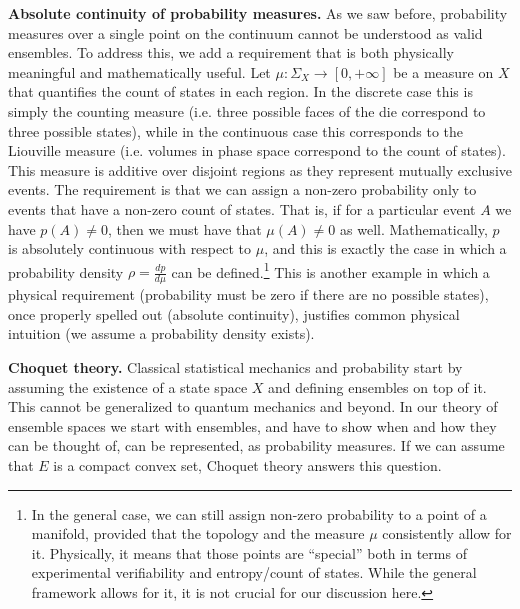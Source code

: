 \documentclass[10pt,twocolumn, nofootinbib]{revtex4-2}
\begin{document}
\textbf{Absolute continuity of probability measures.} As we saw before, probability measures over a single point on the continuum cannot be understood as valid ensembles. To address this, we add a requirement that is both physically meaningful and mathematically useful. Let $\mu : \Sigma_X \to [0, + \infty]$ be a measure on $X$ that quantifies the count of states in each region. In the discrete case this is simply the counting measure (i.e. three possible faces of the die correspond to three possible states), while in the continuous case this corresponds to the Liouville measure (i.e. volumes in phase space correspond to the count of states). This measure is additive over disjoint regions as they represent mutually exclusive events. The requirement is that we can assign a non-zero probability only to events that have a non-zero count of states. That is, if for a particular event $A$ we have $p(A) \neq 0$, then we must have that $\mu(A) \neq 0$ as well. Mathematically, $p$ is absolutely continuous with respect to $\mu$, and this is exactly the case in which a probability density $\rho = \frac{dp}{d\mu}$ can be defined.\footnote{In the general case, we can still assign non-zero probability to a point of a manifold, provided that the topology and the measure $\mu$ consistently allow for it. Physically, it means that those points are ``special'' both in terms of experimental verifiability and entropy/count of states. While the general framework allows for it, it is not crucial for our discussion here.} This is another example in which a physical requirement (probability must be zero if there are no possible states), once properly spelled out (absolute continuity), justifies common physical intuition (we assume a probability density exists).

\textbf{Choquet theory.} Classical statistical mechanics and probability start by assuming the existence of a state space $X$ and defining ensembles on top of it. This cannot be generalized to quantum mechanics and beyond. In our theory of ensemble spaces we start with ensembles, and have to show when and how they can be thought of, can be represented, as probability measures. If we can assume that $E$ is a compact convex set, Choquet theory answers this question.
\end{document}
